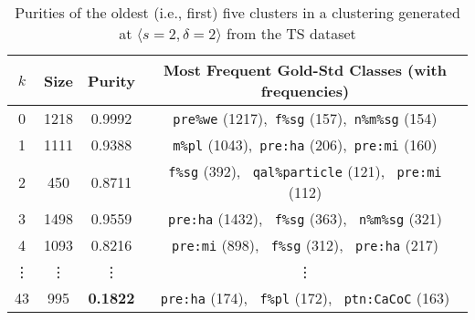 \begin{table}[t]
\centering
\setlength{\extrarowheight}{6pt}
\begin{tabular}{cccc}
\toprule
$k$ &  Size & Purity & Most Frequent Gold-Std Classes (with frequencies) \\
\midrule
0 & 1218 & 0.9992 & \texttt{pre\%we} (1217),\, \texttt{f\%sg} (157), \,\texttt{n\%m\%sg} (154) \\
1 & 1111 & 0.9388 & \texttt{m\%pl} (1043), \,\texttt{pre:ha} (206), \,\texttt{pre:mi} (160) \\
2 & 450 & 0.8711 & \texttt{f\%sg} (392), \, \texttt{qal\%particle} (121), \, \texttt{pre:mi} (112) \\
3 & 1498 & 0.9559 & \texttt{pre:ha} (1432), \, \texttt{f\%sg} (363), \, \texttt{n\%m\%sg} (321) \\
4 & 1093 & 0.8216 & \texttt{pre:mi} (898), \, \texttt{f\%sg} (312), \, \texttt{pre:ha} (217) \\
\vdots & \vdots & \vdots & \vdots \\
43 & 995 & \textbf{0.1822} & \texttt{pre:ha} (174), \, \texttt{f\%pl}  (172), \, \texttt{ptn:CaCoC} (163) \\
\bottomrule
\end{tabular}
\label{tab:best-purities}
\caption{Purities of the oldest (i.e., first) five clusters in a clustering generated at $\langle{s} = 2, \delta = 2\rangle$ from the TS dataset}
\label{tab:best-purities}
\end{table}

